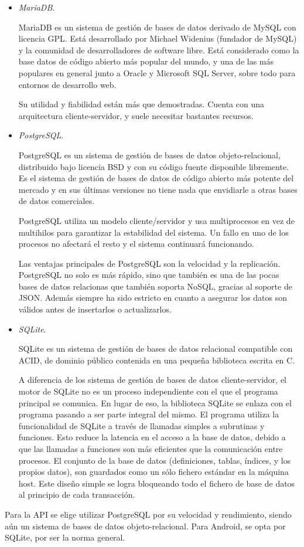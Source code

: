 \begin{itemize}
\item \textit{MariaDB}.~\cite{mariadb}

MariaDB es un sistema de gestión de bases de datos derivado de MySQL con
licencia GPL. Está desarrollado por Michael Widenius (fundador de MySQL) y la
comunidad de desarrolladores de software libre. Está considerado como la base
datos de código abierto más popular del mundo, y una de las más populares en
general junto a Oracle y Microsoft SQL Server, sobre todo para entornos de
desarrollo web.

Su utilidad y fiabilidad están más que demostradas. Cuenta con una arquitectura
cliente-servidor, y suele necesitar bastantes recursos.


\item \textit{PostgreSQL}.~\cite{postgresql}

PostgreSQL es un sistema de gestión de bases de datos objeto-relacional,
distribuido bajo licencia BSD y con su código fuente disponible libremente.
Es el sistema de gestión de bases de datos de código abierto más potente del
mercado y en sus últimas versiones no tiene nada que envidiarle a otras bases
de datos comerciales.

PostgreSQL utiliza un modelo cliente/servidor y usa multiprocesos en vez de
multihilos para garantizar la estabilidad del sistema. Un fallo en uno de los
procesos no afectará el resto y el sistema continuará funcionando.

Las ventajas principales de PostgreSQL son la velocidad y la replicación. 
PostgreSQL no solo es más rápido, sino que también es una de las pocas
bases de datos relacionas que también soporta NoSQL, gracias al soporte de JSON.
Además siempre ha sido estricto en cuanto a asegurar los datos son
válidos antes de insertarlos o actualizarlos.~\cite{postgresql-over-mariadb}


\item \textit{SQLite}.~\cite{sqlite}

SQLite es un sistema de gestión de bases de datos relacional compatible con ACID,
de dominio público contenida en una pequeña biblioteca escrita en C.

A diferencia de los sistema de gestión de bases de datos cliente-servidor, el
motor de SQLite no es un proceso independiente con el que el programa principal
se comunica. En lugar de eso, la biblioteca SQLite se enlaza con el programa
pasando a ser parte integral del mismo. El programa utiliza la funcionalidad de
SQLite a través de llamadas simples a subrutinas y funciones. Esto reduce la
latencia en el acceso a la base de datos, debido a que las llamadas a funciones
son más eficientes que la comunicación entre procesos. El conjunto de la base de
datos (definiciones, tablas, índices, y los propios datos), son guardados como
un sólo fichero estándar en la máquina host. Este diseño simple se logra
bloqueando todo el fichero de base de datos al principio de cada transacción.

\end{itemize}

Para la API se elige utilizar PostgreSQL por su velocidad y rendimiento, siendo
aún un sistema de bases de datos objeto-relacional. Para Android, se opta por
SQLite, por ser la norma general.

